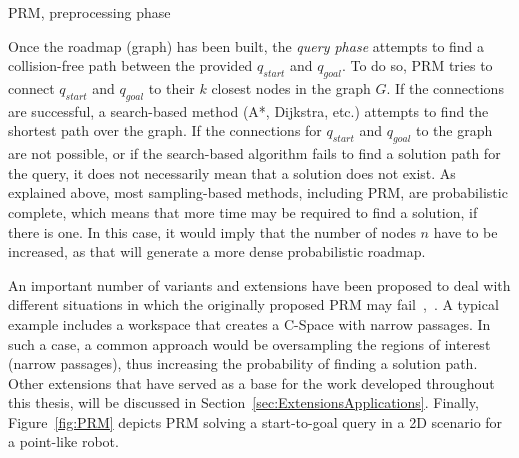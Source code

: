 \begin{algorithm}[htbp]
	\DontPrintSemicolon


	
	
 \caption{PRM, preprocessing phase}
 \label{alg:PRM-Preprocessing-Phase}
\end{algorithm}

Once the roadmap (graph) has been built, the \textit{query phase} attempts to
find a collision-free path between the provided $q_{start}$ and $q_{goal}$. To
do so, \ac{PRM} tries to connect $q_{start}$ and $q_{goal}$ to their $k$ closest
nodes in the graph $G$. If the connections are successful, a search-based method
(\eg A*, Dijkstra, etc.) attempts to find the shortest path over the graph. If
the connections for $q_{start}$ and $q_{goal}$ to the graph are not possible, or
if the search-based algorithm fails to find a solution path for the query, it
does not necessarily mean that a solution does not exist. As explained above,
most sampling-based methods, including \ac{PRM}, are probabilistic complete,
which means that more time may be required to find a solution, if there is one.
In this case, it would imply that the number of nodes $n$ have to be increased,
as that will generate a more dense probabilistic roadmap.

An important number of variants and extensions have been proposed to deal with
different situations in which the originally proposed \ac{PRM} may
fail~\cite{Choset2005},~\cite{LaValle2006}. A typical example includes a
workspace that creates a \ac{C-Space} with narrow passages. In such a case, a
common approach would be oversampling the regions of interest (\eg narrow
passages), thus increasing the probability of finding a solution path. Other
extensions that have served as a base for the work developed throughout this
thesis, will be discussed in Section~\ref{sec:ExtensionsApplications}.
Finally, Figure~\ref{fig:PRM} depicts \ac{PRM} solving a start-to-goal query in
a \ac{2D} scenario for a point-like robot.

